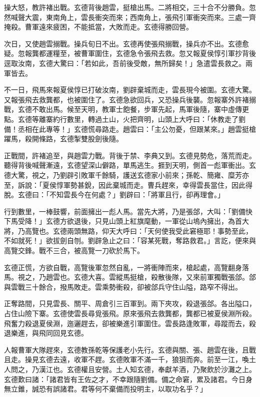 操大怒，教許褚出戰。玄德背後趙雲，挺槍出馬。二將相交，三十合不分勝負。忽然喊聲大震，東南角上，雲長衝突而來；西南角上，張飛引軍衝突而來。三處一齊掩殺。曹軍遠來疲困，不能抵當，大敗而走。玄德得勝回營。

次日，又使趙雲搦戰。操兵旬日不出。玄德再使張飛搦戰，操兵亦不出。玄德愈疑。忽報龔都運糧至，被曹軍圍住，玄德急令張飛去救。忽又報夏侯惇引軍抄背後逕取汝南，玄德大驚曰：「若如此，吾前後受敵，無所歸矣！」急遣雲長救之。兩軍皆去。

不一日，飛馬來報夏侯惇已打破汝南，劉辟棄城而走，雲長現今被圍。玄德大驚。又報張飛去救龔都，也被圍住了。玄德急欲回兵，又恐操兵後襲。忽報寨外許褚搦戰，玄德不敢出馬。候至天明，教軍士飽餐，步軍先起，馬軍後隨，寨中虛傳更點。玄德等離寨約行數里，轉過土山，火把齊明，山頭上大呼曰：「休教走了劉備！丞相在此專等！」玄德慌尋路走。趙雲曰：「主公勿憂，但跟某來。」趙雲挺槍躍馬，殺開條路，玄德掣雙股劍後隨。

正戰間，許褚追至，與趙雲力戰。背後于禁、李典又到。玄德見勢危，落荒而走。聽得背後喊聲漸遠，玄德望深山僻路，單馬逃生。捱到天明，側首一彪軍衝出。玄德大驚，視之，乃劉辟引敗軍千餘騎，護送玄德家小前來；孫乾、簡雍、糜芳亦至，訴說：「夏侯惇軍勢甚銳，因此棄城而走。曹兵趕來，幸得雲長當住，因此得脫。玄德曰：「不知雲長今在何處？」劉辟曰：「將軍且行，卻再理會。」

行到數里，一棒鼓響，前面擁出一彪人馬。當先大將，乃是張郃，大叫：「劉備快下馬受降！」玄德方欲退後，只見山頭上紅旗麾動，一軍從山塢內擁出，為首大將，乃高覽也。玄德兩頭無路，仰天大呼曰：「天何使我受此窘極耶！事勢至此，不如就死！」欲拔劍自刎。劉辟急止之曰：「容某死戰，奪路救君。」言訖，便來與高覽交鋒。戰不三合，被高覽一刀砍於馬下。

玄德正慌，方欲自戰，高覽後軍忽然自亂，一將衝陣而來，槍起處，高覽翻身落馬。視之，乃趙雲也。玄德大喜。雲縱馬挺槍，殺散後隊，又來前軍獨戰張郃。郃與雲戰三十餘合，撥馬敗走。雲乘勢衝殺，卻被郃兵守住山隘，路窄不得出。

正奪路間，只見雲長、關平、周倉引三百軍到。兩下夾攻，殺退張郃。各出隘口，占住山險下寨。玄德使雲長尋覓張飛。原來張飛去救龔都，龔都已被夏侯淵所殺。飛奮力殺退夏侯淵，迤邐趕去，卻被樂進引軍圍住。雲長路逢敗軍，尋蹤而去，殺退樂進，與飛同回見玄德。

人報曹軍大隊趕來，玄德教孫乾等保護老小先行。玄德與關、張、趙雲在後，且戰且走。操見玄德去遠，收軍不趕。玄德敗軍不滿一千，狼狽而奔。前至一江，喚土人問之，乃漢江也。玄德權且安營。土人知玄德，奉獻羊酒，乃聚飲於沙灘之上。玄德歎曰諸：「諸君皆有王佐之才，不幸跟隨劉備。備之命窘，累及諸君。今日身無立錐，誠恐有誤諸君。君等何不棄備而投明主，以取功名乎？」

